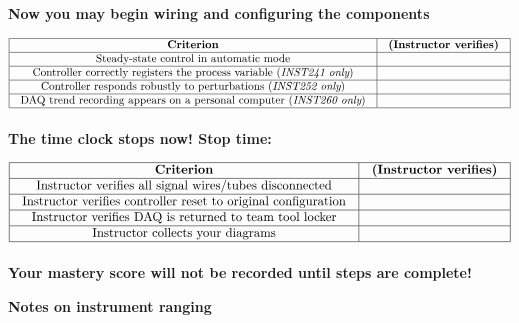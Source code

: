 \vskip 10pt

\centerline{\bf Now you may begin wiring and configuring the components}

\vskip 10pt


$$\vbox{\offinterlineskip
\halign{\strut
\vrule \quad\hfil # \ \hfil & 
\vrule \quad\hfil # \ \hfil \vrule \cr
\noalign{\hrule}
%
{\bf Criterion} & {\bf (Instructor verifies)} \cr
%
\noalign{\hrule}
%
Steady-state control in automatic mode &  \cr
%
\noalign{\hrule}
%
Controller correctly registers the process variable ({\it INST241 only}) &  \cr
%
\noalign{\hrule}
%
Controller responds robustly to perturbations ({\it INST252 only}) &  \cr
%
\noalign{\hrule}
%
DAQ trend recording appears on a personal computer ({\it INST260 only}) &  \cr
%
\noalign{\hrule}
} %
}$$ %

\vskip 10pt

\centerline{\bf The time clock stops now! \hskip 50pt Stop time: \underbar{\hskip 80pt}}



$$\vbox{\offinterlineskip
\halign{\strut
\vrule \quad\hfil # \ \hfil & 
\vrule \quad\hfil # \ \hfil \vrule \cr
\noalign{\hrule}
%
{\bf Criterion} & {\bf (Instructor verifies)} \cr
%
\noalign{\hrule}
%
Instructor verifies all signal wires/tubes disconnected &  \cr
%
\noalign{\hrule}
%
Instructor verifies controller reset to original configuration &  \cr
%
\noalign{\hrule}
%
Instructor verifies DAQ is returned to team tool locker &  \cr
%
\noalign{\hrule}
%
Instructor collects your diagrams &  \cr
%
\noalign{\hrule}
} %
}$$ %

\vskip 10pt

\centerline{\bf Your mastery score will not be recorded until  steps are complete!}







\vfil \eject

\centerline{\bf Notes on instrument ranging}

\vskip 10pt

